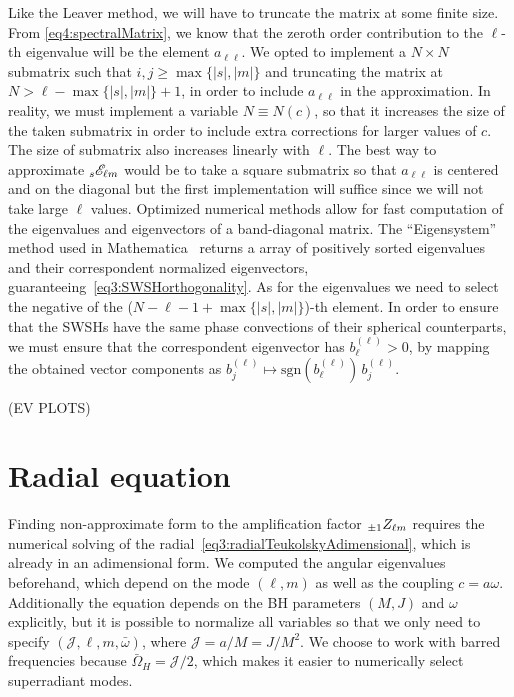 Like the Leaver method, we will have to truncate the matrix at some finite size.
From \eqref{eq4:spectralMatrix}, we know that the zeroth order contribution to the $\ell$-th eigenvalue will be the element $a_{\ell\ell}$.
We opted to implement a $N\times N$ submatrix such that $i,j\ge\max\{|s|,|m|\}$ and truncating the matrix at $N > \ell - \max\{|s|,|m|\} + 1$, in order to include $a_{\ell\ell}$ in the approximation.
In reality, we must implement a variable $N\equiv N(c)$, so that it increases the size of the taken submatrix in order to include extra corrections for larger values of $c$. The size of submatrix also increases linearly with $\ell$.
The best way to approximate $\uu[s]{\mathscr{E}}{\ell m}$ would be to take a square submatrix so that $a_{\ell\ell}$ is centered and on the diagonal but the first implementation will suffice since we will not take large $\ell$ values.
Optimized numerical methods allow for fast computation of the eigenvalues and eigenvectors of a band-diagonal matrix.
The ``Eigensystem'' method used in Mathematica\texttrademark~ returns a array of positively sorted eigenvalues and their correspondent normalized eigenvectors, guaranteeing~\eqref{eq3:SWSHorthogonality}. As for the eigenvalues we need to select the negative of the ($N-\ell-1+\max\{|s|,|m|\}$)-th element. In order to ensure that the SWSHs have the same phase convections of their spherical counterparts, we must ensure that the correspondent eigenvector has $b_\ell^{(\ell)}>0$, by mapping the obtained vector components as $b_j^{(\ell)}\mapsto \mathrm{sgn}(b_\ell^{(\ell)}) \,b_j^{(\ell)}$.

(EV PLOTS)

\section{Radial equation}

Finding non-approximate form to the amplification factor $\uu[\pm 1]{Z}{\ell m}$ requires the numerical solving of the radial~\eqref{eq3:radialTeukolskyAdimensional}, which is already in an adimensional form.
We computed the angular eigenvalues beforehand, which depend on the mode $(\ell,m)$ as well as the coupling $c=a\omega$.
Additionally the equation depends on the BH parameters $(M,J)$ and $\omega$ explicitly, but it is possible to normalize all variables so that we only need to specify $(\mathscr{J}, \ell, m, \bar{\omega})$, where $\mathscr{J}=a/M=J/M^2$.
We choose to work with barred frequencies because $\bar{\Omega}_H = \mathscr{J}/2$, which makes it easier to numerically select superradiant modes.

